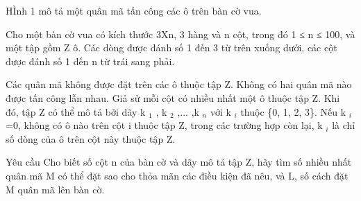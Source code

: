 HÌnh 1 mô tả một quân mã tấn công các ô trên bàn cờ vua.  

   Cho một bàn cờ vua có kích thước 3Xn, 3 hàng và n cột, trong đó 1 ≤ n ≤ 100, và một tập gồm Z ô. Các dòng được đánh số 1 đến 3 từ   trên xuống dưới, các cột được đánh số 1 đến n từ trái sang phải.  

   Các quân mã không được đặt trên các ô thuộc tập Z. Không có hai quân mã nào được tấn công lẫn nhau. Giả sử mỗi cột có nhiều nhất một ô   thuộc tập Z. Khi đó, tập Z có thể mô tả bởi dãy k   $_    1   $   , k   $_    2   $   ,... ,k   $_    n   $   với k   $_    i   $   thuộc \{0, 1, 2, 3\}. Nếu   k   $_    i   $   =0, không có ô nào trên cột i thuộc tập Z, trong các trường hợp còn lại, k   $_    i   $   là chỉ số dòng của ô trên cột này thuộc   tập Z.  

Yêu cầu
Cho biết số cột n của bàn cờ và dãy mô tả tập Z, hãy tìm số nhiều nhất quân mã M có thể đặt sao cho thỏa mãn các điều kiện đã nêu, và L,   số cách đặt M quân mã lên bàn cờ.